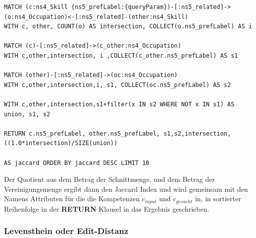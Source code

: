 \begin{lstlisting}[language=SPARQL, morekeywords={MATCH, WITH, COLLECT}]
MATCH (c:ns4_Skill {ns5_prefLabel:{queryParam})-[:ns5_related]->(o:ns4_Occupation)<-[:ns5_related]-(other:ns4_Skill)
WITH c, other, COUNT(o) AS intersection, COLLECT(o.ns5_prefLabel) AS i

MATCH (c)-[:ns5_related]->(c_other:ns4_Occupation)
WITH c,other,intersection, i ,COLLECT(c_other.ns5_prefLabel) AS s1

MATCH (other)-[:ns5_related]->(oc:ns4_Occupation)
WITH c,other,intersection,i, s1, COLLECT(oc.ns5_prefLabel) AS s2

WITH c,other,intersection,s1+filter(x IN s2 WHERE NOT x IN s1) AS union, s1, s2

RETURN c.ns5_prefLabel, other.ns5_prefLabel, s1,s2,intersection,((1.0*intersection)/SIZE(union)) 

AS jaccard ORDER BY jaccard DESC LIMIT 10

\end{lstlisting}


Der Quotient aus dem Betrag der Schnittmenge, und dem Betrag der Vereinigungsmenge ergibt dann den Jaccard Index und wird gemeinsam mit den Namens Attributen für die die Kompetenzen $c_{input}$ und $c_{gesucht}$  in, in sortierter Reihenfolge in der \textbf{RETURN} Klausel in das Ergebnis geschrieben.


\subsubsection{Levensthein oder Edit-Distanz}


